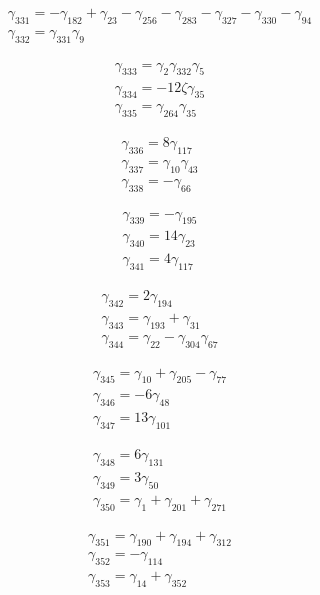 \[\begin{aligned}\gamma_{331}=- \gamma_{182} + \gamma_{23} - \gamma_{256} - \gamma_{283} - \gamma_{327} - \gamma_{330} - \gamma_{94}\\ \gamma_{332}=\gamma_{331} \gamma_{9}\end{aligned}\]

\[\begin{aligned}\gamma_{333}=\gamma_{2} \gamma_{332} \gamma_{5}\\ \gamma_{334}=- 12 \zeta  \gamma_{35}\\ \gamma_{335}=\gamma_{264} \gamma_{35}\end{aligned}\]

\[\begin{aligned}\gamma_{336}=8 \gamma_{117}\\ \gamma_{337}=\gamma_{10} \gamma_{43}\\ \gamma_{338}=- \gamma_{66}\end{aligned}\]

\[\begin{aligned}\gamma_{339}=- \gamma_{195}\\ \gamma_{340}=14 \gamma_{23}\\ \gamma_{341}=4 \gamma_{117}\end{aligned}\]

\[\begin{aligned}\gamma_{342}=2 \gamma_{194}\\ \gamma_{343}=\gamma_{193} + \gamma_{31}\\ \gamma_{344}=\gamma_{22} - \gamma_{304} \gamma_{67}\end{aligned}\]

\[\begin{aligned}\gamma_{345}=\gamma_{10} + \gamma_{205} - \gamma_{77}\\ \gamma_{346}=- 6 \gamma_{48}\\ \gamma_{347}=13 \gamma_{101}\end{aligned}\]

\[\begin{aligned}\gamma_{348}=6 \gamma_{131}\\ \gamma_{349}=3 \gamma_{50}\\ \gamma_{350}=\gamma_{1} + \gamma_{201} + \gamma_{271}\end{aligned}\]

\[\begin{aligned}\gamma_{351}=\gamma_{190} + \gamma_{194} + \gamma_{312}\\ \gamma_{352}=- \gamma_{114}\\ \gamma_{353}=\gamma_{14} + \gamma_{352}\end{aligned}\]

